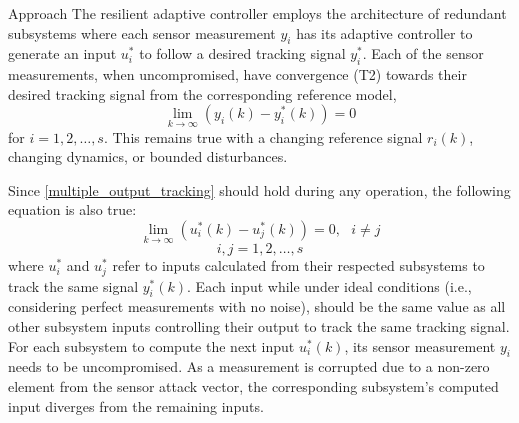 \begin{section}{Approach}
The resilient adaptive controller employs the architecture of redundant subsystems where each sensor measurement $y_i$ has its adaptive controller to generate an input $u^*_i$ to follow a desired tracking signal $y^*_i$. Each of the sensor measurements, when uncompromised, have convergence (T2) towards their desired tracking signal from the corresponding reference model,
    \begin{equation}
    \label{multiple_output_tracking}
    \lim_{k\to\infty}(y_i(k)-y^*_i(k))=0
    \end{equation}
for $i=1,2,\dots,s$. This remains true with a changing reference signal $r_i(k)$, changing dynamics, or bounded disturbances. 


Since \eqref{multiple_output_tracking} should hold during any operation, the following equation is also true:
\begin{equation}
    \label{eq:u_to_0}
    \lim_{k\to\infty}(u^*_i(k)-u^*_j(k))=0, \text{ }i\neq j
\end{equation}
\begin{equation}
    i,j = 1,2,\dots,s \nonumber
\end{equation}
where $u^*_i$ and $u^*_j$ refer to inputs calculated from their respected subsystems to track the same signal $y_i^*(k)$. Each input while under ideal conditions (i.e., considering perfect measurements with no noise), should be the same value as all other subsystem inputs controlling their output to track the same tracking signal. For each subsystem to compute the next input $u^*_i(k)$, its sensor measurement $y_i$ needs to be uncompromised. As a measurement is corrupted due to a non-zero element from the sensor attack vector, the corresponding subsystem's computed input diverges from the remaining inputs. 




\end{section}
